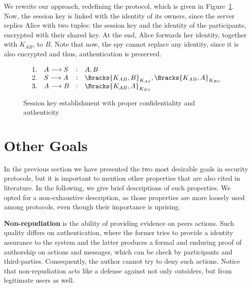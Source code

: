 We rewrite our approach, redefining the protocol, which is given in Figure~\ref{prt:session-key-auth}. Now, the session key is linked with the identity of its owners, since the server replies Alice with two tuples: the session key and the identity of the participants, encrypted with their shared key. At the end, Alice forwards her identity, together with $K_{AB}$, to $B$. Note that now, the spy cannot replace any identity, since it is also encrypted and thus, authentication is preserved.

\begin{figure}[ht]
  \centering
  \[
    \begin{array}{rlcl}
      1. & A \longrightarrow S &:& A, B \\
      2. & S \longrightarrow A &:& \Bracks{K_{AB}, B}_{K_{AS}}, \Bracks{K_{AB}, A}_{K_{BS}} \\
      3. & A \longrightarrow B &:& \Bracks{K_{AB}, A}_{K_{BS}} \\
    \end{array}
  \]
  \caption{Session key establishment with proper confidentiality and authenticity}
  \label{prt:session-key-auth}
\end{figure}


















\section{Other Goals}
In the previous section we have presented the two most desirable goals in security protocols, but it is important to mention other properties that are also cited in literature. In the following, we give brief descriptions of such properties. We opted for a non-exhaustive description, as those properties are more loosely used among protocols, even though their importance is uprising.

\textbf{Non-repudiation} is the ability of providing evidence on peers actions. Such quality differs on authentication, where the former tries to provide a identity assurance to the system and the latter produces a formal and enduring proof of authorship on actions and messages, which can be check by participants and third-parties. Consequently, the author cannot try to deny such actions. Notice that non-repudiation acts like a defense against not only outsiders, but from legitimate users as well.

